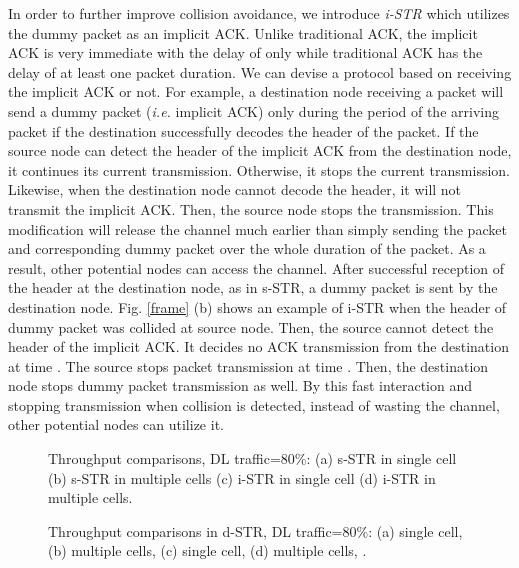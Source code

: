 \documentclass[twocolumn]{IEEEtran}
\begin{document}
In order to further improve collision avoidance, we introduce
\textit{i-STR} which utilizes the dummy packet as an implicit ACK.
Unlike traditional ACK, the implicit ACK is very immediate with the
delay of only  while traditional ACK has the delay of at least
one packet duration. We can devise a protocol based on receiving the
implicit ACK or not. For example, a destination node receiving a
packet will send a dummy packet (\textit{i.e.} implicit ACK) only
during the period of the arriving packet if the destination
successfully decodes the header of the packet. If the source node
can detect the header of the implicit ACK from the destination node,
it continues its current transmission. Otherwise, it stops the
current transmission. Likewise, when the destination node cannot
decode the header, it will not transmit the implicit ACK. Then, the
source node stops the transmission. This modification will release
the channel much earlier than simply sending the packet and
corresponding dummy packet over the whole duration of the packet. As
a result, other potential nodes can access the channel. After
successful reception of the header at the destination node, as in
s-STR, a dummy packet is sent by the destination node. Fig.
\ref{frame} (b) shows an example of i-STR when the header of dummy
packet was collided at source node. Then, the source cannot detect
the header of the implicit ACK. It decides no ACK transmission from
the destination at time . The source stops packet transmission
at time . Then, the destination node stops dummy packet
transmission as well. By this fast interaction and stopping
transmission when collision is detected, instead of wasting the
channel, other potential nodes can utilize it.

\begin{figure*}[!t]

\centerline{ 
\hfil {}
} \centerline{ 
\hfil {}}

\caption{Throughput comparisons, DL traffic=80\%: (a) s-STR in
single cell (b) s-STR in multiple cells (c) i-STR in single cell (d)
i-STR in multiple cells. } \label{fig_s_i_STR}

\end{figure*}

\begin{figure*}[!ht]

\centerline{ 
\hfil {}
} \centerline{ 
\hfil {}}

\caption{Throughput comparisons in d-STR, DL traffic=80\%: (a)
single cell,  (b) multiple cells,  (c) single
cell,  (d) multiple cells, . } \label{fig_d_STR}

\end{figure*}
\end{document}
